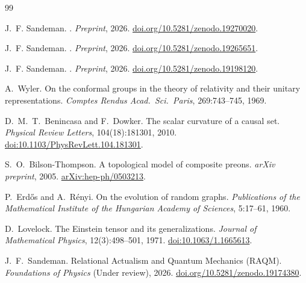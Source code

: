 \documentclass[11pt,a4paper]{article}
\begin{document}
\begin{thebibliography}{99}

J.~F. Sandeman.
.
\newblock \textit{Preprint}, 2026.
\newblock \href{https://doi.org/10.5281/zenodo.19270020}{doi.org/10.5281/zenodo.19270020}.


J.~F. Sandeman.
.
\newblock \textit{Preprint}, 2026.
\newblock \href{https://doi.org/10.5281/zenodo.19265651}{doi.org/10.5281/zenodo.19265651}.

J.~F. Sandeman.
.
\newblock \textit{Preprint}, 2026.
\newblock \href{https://doi.org/10.5281/zenodo.19198120}{doi.org/10.5281/zenodo.19198120}.


A.~Wyler.
\newblock On the conformal groups in the theory of relativity and their
  unitary representations.
\newblock \emph{Comptes Rendus Acad.~Sci.~Paris}, 269:743--745, 1969.

D.~M.~T.~Benincasa and F.~Dowker.
\newblock The scalar curvature of a causal set.
\newblock \emph{Physical Review Letters}, 104(18):181301, 2010.
\newblock \href{https://doi.org/10.1103/PhysRevLett.104.181301}{doi:10.1103/PhysRevLett.104.181301}.

S.~O.~Bilson-Thompson.
\newblock A topological model of composite preons.
\newblock \emph{arXiv preprint}, 2005.
\newblock \href{https://arxiv.org/abs/hep-ph/0503213}{arXiv:hep-ph/0503213}.

P.~Erd\H{o}s and A.~R\'{e}nyi.
\newblock On the evolution of random graphs.
\newblock \emph{Publications of the Mathematical Institute of the Hungarian
  Academy of Sciences}, 5:17--61, 1960.

D.~Lovelock.
\newblock The Einstein tensor and its generalizations.
\newblock \emph{Journal of Mathematical Physics}, 12(3):498--501, 1971.
\newblock \href{https://doi.org/10.1063/1.1665613}{doi:10.1063/1.1665613}.

J.~F.~Sandeman.
\newblock Relational Actualism and Quantum Mechanics ({RAQM}).
\newblock \textit{Foundations of Physics} (Under review), 2026.
\newblock \href{https://doi.org/10.5281/zenodo.19174380}{doi.org/10.5281/zenodo.19174380}.


\end{thebibliography}
\end{document}
